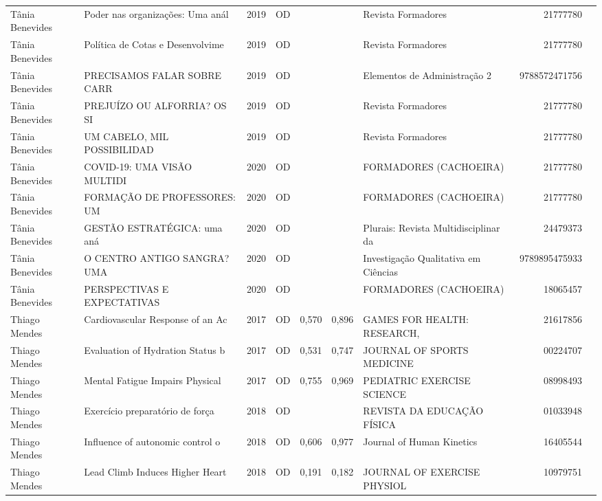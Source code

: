 \documentclass[12pt,brazil]{article}\usepackage[]{graphicx}\usepackage[]{xcolor}
\begin{document}
\begin{longtable}{lllrrllrr}
Tânia Benevides & Poder nas organizações: Uma anál & 2019 & OD &  &  & Revista Formadores & 21777780 \\
Tânia Benevides & Política de Cotas e Desenvolvime & 2019 & OD &  &  & Revista Formadores & 21777780 \\
\rowcolor{duplic}\rowcolor{duplic}\rowcolor{duplic}\rowcolor{duplic}\rowcolor{duplic}\rowcolor{duplic}\rowcolor{duplic}\rowcolor{duplic}\rowcolor{duplic}\rowcolor{duplic}\rowcolor{duplic}\rowcolor{duplic}\rowcolor{duplic}\rowcolor{duplic}\rowcolor{duplic}\rowcolor{duplic}Tânia Benevides & PRECISAMOS FALAR SOBRE CARR & 2019 & OD &  &  & Elementos de Administração 2 & 9788572471756 \\
Tânia Benevides & PREJUÍZO OU ALFORRIA? OS SI & 2019 & OD &  &  & Revista Formadores & 21777780 \\
Tânia Benevides & UM CABELO, MIL POSSIBILIDAD & 2019 & OD &  &  & Revista Formadores & 21777780 \\
Tânia Benevides & COVID-19: UMA VISÃO MULTIDI & 2020 & OD &  &  & FORMADORES (CACHOEIRA) & 21777780 \\
Tânia Benevides & FORMAÇÃO DE PROFESSORES: UM & 2020 & OD &  &  & FORMADORES (CACHOEIRA) & 21777780 \\
Tânia Benevides & GESTÃO ESTRATÉGICA: uma aná & 2020 & OD &  &  & Plurais: Revista Multidisciplinar da & 24479373 \\
Tânia Benevides & O CENTRO ANTIGO SANGRA? UMA & 2020 & OD &  &  & Investigação Qualitativa em Ciências & 9789895475933 \\
Tânia Benevides & PERSPECTIVAS E EXPECTATIVAS & 2020 & OD &  &  & FORMADORES (CACHOEIRA) & 18065457 \\
Thiago Mendes & Cardiovascular Response of an Ac & 2017 & OD & 0,570 & 0,896 & GAMES FOR HEALTH: RESEARCH, & 21617856 \\
Thiago Mendes & Evaluation of Hydration Status b & 2017 & OD & 0,531 & 0,747 & JOURNAL OF SPORTS MEDICINE  & 00224707 \\
Thiago Mendes & Mental Fatigue Impairs Physical  & 2017 & OD & 0,755 & 0,969 & PEDIATRIC EXERCISE SCIENCE & 08998493 \\
Thiago Mendes & Exercício preparatório de força  & 2018 & OD &  &  & REVISTA DA EDUCAÇÃO FÍSICA  & 01033948 \\
Thiago Mendes & Influence of autonomic control o & 2018 & OD & 0,606 & 0,977 & Journal of Human Kinetics & 16405544 \\
Thiago Mendes & Lead Climb Induces Higher Heart  & 2018 & OD & 0,191 & 0,182 & JOURNAL OF EXERCISE PHYSIOL & 10979751 \\

\end{longtable}
\end{document}
